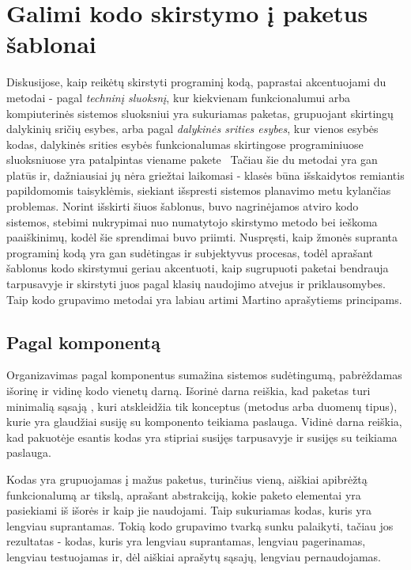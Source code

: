 \section{Galimi kodo skirstymo į paketus šablonai}
Diskusijose, kaip reikėtų skirstyti programinį kodą, paprastai akcentuojami du metodai - pagal \textit{techninį sluoksnį},
kur kiekvienam funkcionalumui arba kompiuterinės sistemos sluoksniui yra sukuriamas paketas,
grupuojant skirtingų dalykinių sričių esybes, arba pagal \textit{dalykinės srities esybes}, kur vienos esybės kodas, dalykinės srities
esybės funkcionalumas skirtingose programiniuose sluoksniuose yra patalpintas viename pakete~\cite{PackagingWays}
Tačiau šie du metodai yra gan platūs ir, dažniausiai jų nėra griežtai laikomasi - klasės būna išskaidytos remiantis papildomomis taisyklėmis,
siekiant išspresti sistemos planavimo metu kylančias problemas. Norint išskirti šiuos šablonus, buvo nagrinėjamos atviro kodo sistemos,
stebimi nukrypimai nuo numatytojo skirstymo metodo bei ieškoma paaiškinimų, kodėl šie sprendimai buvo priimti.
Nuspręsti, kaip žmonės supranta programinį kodą yra gan sudėtingas ir subjektyvus procesas, todėl aprašant šablonus kodo skirstymui
geriau akcentuoti, kaip sugrupuoti paketai bendrauja tarpusavyje ir skirstyti juos pagal klasių naudojimo atvejus ir priklausomybes.
Taip kodo grupavimo metodai yra labiau artimi Martino aprašytiems principams.

\subsection{Pagal komponentą}
Organizavimas pagal komponentus sumažina sistemos sudėtingumą, pabrėždamas išorinę ir vidinę kodo vienetų darną.
Išorinė darna reiškia, kad paketas turi minimalią sąsają , kuri atskleidžia tik konceptus (metodus arba duomenų tipus),
kurie yra glaudžiai susiję su komponento teikiama paslauga.
Vidinė darna reiškia, kad pakuotėje esantis kodas yra stipriai susijęs tarpusavyje ir susijęs su teikiama paslauga.

Kodas yra grupuojamas į mažus paketus, turinčius vieną, aiškiai apibrėžtą funkcionalumą ar tikslą, aprašant abstrakciją, kokie paketo elementai
yra pasiekiami iš išorės ir kaip jie naudojami.
Taip sukuriamas kodas, kuris yra lengviau suprantamas.
Tokią kodo grupavimo tvarką sunku palaikyti, tačiau jos rezultatas - kodas, kuris yra lengviau suprantamas, lengviau pagerinamas, lengviau testuojamas
ir, dėl aiškiai aprašytų sąsajų, lengviau pernaudojamas.

